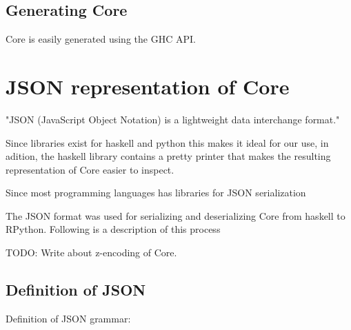 \documentclass{article}
\begin{document}








\subsection{Generating Core}

Core is easily generated using the GHC API.

\section{JSON representation of Core}

"JSON (JavaScript Object Notation) is a lightweight data interchange format."

Since libraries exist for haskell and python this makes it ideal for our use,
in adition, the haskell library contains a pretty printer that makes the resulting
representation of Core easier to inspect.

Since most programming languages has libraries for JSON serialization

The JSON format was used for serializing and deserializing Core from haskell to RPython.
Following is a description of this process


TODO: Write about z-encoding of Core.


\subsection{Definition of JSON}

Definition of JSON grammar:
\end{document}
